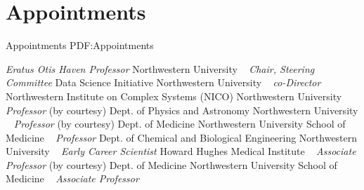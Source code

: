\section
{Appointments}
{Appointments}
{PDF:Appointments}

\textit{Eratus Otis Haven Professor} 
\newline
Northwestern University
\newline
~
\Gap
{}
\textit{Chair, Steering Committee} 
    \newline
    Data Science Initiative
\newline
Northwestern University
\newline
~
\Gap
{}
\textit{co-Director} 
    \newline
    Northwestern Institute on Complex Systems (NICO)
\newline
Northwestern University
\newline
~
\Gap
{}
\textit{Professor} (by courtesy)
    \newline
    Dept. of Physics and Astronomy
\newline
Northwestern University
\newline
~
\Gap
{}
\textit{Professor} (by courtesy)
    \newline
    Dept. of Medicine
\newline
Northwestern University School of Medicine
\newline
~
\Gap
{}
\textit{Professor} 
    \newline
    Dept. of Chemical and Biological Engineering
\newline
Northwestern University
\newline
~
\Gap
{}
\textit{Early Career Scientist} 
\newline
Howard Hughes Medical Institute
\newline
~
\Gap
{}
\textit{Associate Professor} (by courtesy)
    \newline
    Dept. of Medicine
\newline
Northwestern University School of Medicine
\newline
~
\Gap
{}
\textit{Associate Professor} 
    \newline

